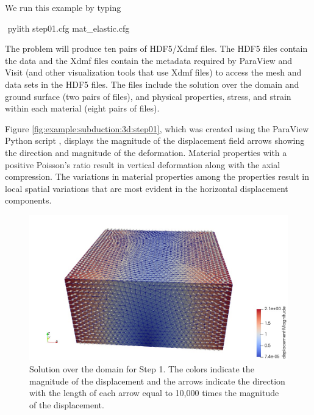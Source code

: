We run this example by typing
\begin{shell}
$$ pylith step01.cfg mat_elastic.cfg
\end{shell}
The problem will produce ten pairs of HDF5/Xdmf files. The HDF5
files contain the data and the Xdmf files contain the metadata required
by ParaView and Visit (and other visualization tools that
use Xdmf files) to access the mesh and data sets in the HDF5 files.
The files include the solution over the domain and ground surface
(two pairs of files), and physical properties, stress, and strain within
each material (eight pairs of files). 

Figure \vref{fig:example:subduction:3d:step01}, which was created
using the ParaView Python script , displays
the magnitude of the displacement field arrows showing the direction
and magnitude of the deformation. Material properties with a positive
Poisson's ratio result in vertical deformation along with the axial
compression. The variations in material properties among the
properties result in local spatial variations that are most evident in
the horizontal displacement components.

\begin{figure}
  \includegraphics[width=5.0in]{examples/figs/subduction3d_step01_soln}
  \caption{Solution over the domain for Step 1. The colors indicate
    the magnitude of the displacement and the arrows indicate the
    direction with the length of each arrow equal to 10,000 times the
    magnitude of the displacement.}
  \label{fig:example:subduction:3d:step01}
\end{figure}


